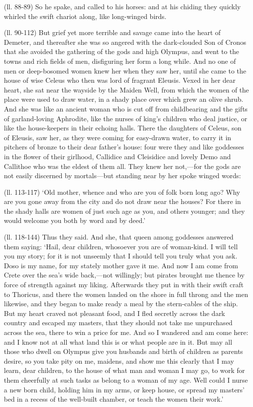 (ll. 88-89) So he spake, and called to his horses: and at his chiding they
quickly whirled the swift chariot along, like long-winged birds.

(ll. 90-112) But grief yet more terrible and savage came into the heart of
Demeter, and thereafter she was so angered with the dark-clouded Son of Cronos
that she avoided the gathering of the gods and high Olympus, and went to the
towns and rich fields of men, disfiguring her form a long while. And no one of
men or deep-bosomed women knew her when they saw her, until she came to the
house of wise Celeus who then was lord of fragrant Eleusis. Vexed in her dear
heart, she sat near the wayside by the Maiden Well, from which the women of the
place were used to draw water, in a shady place over which grew an olive shrub.
And she was like an ancient woman who is cut off from childbearing and the
gifts of garland-loving Aphrodite, like the nurses of king’s children who
deal justice, or like the house-keepers in their echoing halls. There the
daughters of Celeus, son of Eleusis, saw her, as they were coming for
easy-drawn water, to carry it in pitchers of bronze to their dear
father’s house: four were they and like goddesses in the flower of their
girlhood, Callidice and Cleisidice and lovely Demo and Callithoe who was the
eldest of them all. They knew her not,—for the gods are not easily
discerned by mortals—but standing near by her spoke winged words:

(ll. 113-117) ‘Old mother, whence and who are you of folk born long ago?
Why are you gone away from the city and do not draw near the houses? For there
in the shady halls are women of just such age as you, and others younger; and
they would welcome you both by word and by deed.’

(ll. 118-144) Thus they said. And she, that queen among goddesses answered them
saying: ‘Hail, dear children, whosoever you are of woman-kind. I will
tell you my story; for it is not unseemly that I should tell you truly what you
ask. Doso is my name, for my stately mother gave it me. And now I am come from
Crete over the sea’s wide back,—not willingly; but pirates brought
me thence by force of strength against my liking. Afterwards they put in with
their swift craft to Thoricus, and there the women landed on the shore in full
throng and the men likewise, and they began to make ready a meal by the
stern-cables of the ship. But my heart craved not pleasant food, and I fled
secretly across the dark country and escaped my masters, that they should not
take me unpurchased across the sea, there to win a price for me. And so I
wandered and am come here: and I know not at all what land this is or what
people are in it. But may all those who dwell on Olympus give you husbands and
birth of children as parents desire, so you take pity on me, maidens, and show
me this clearly that I may learn, dear children, to the house of what man and
woman I may go, to work for them cheerfully at such tasks as belong to a woman
of my age. Well could I nurse a new born child, holding him in my arms, or keep
house, or spread my masters’ bed in a recess of the well-built chamber,
or teach the women their work.’

